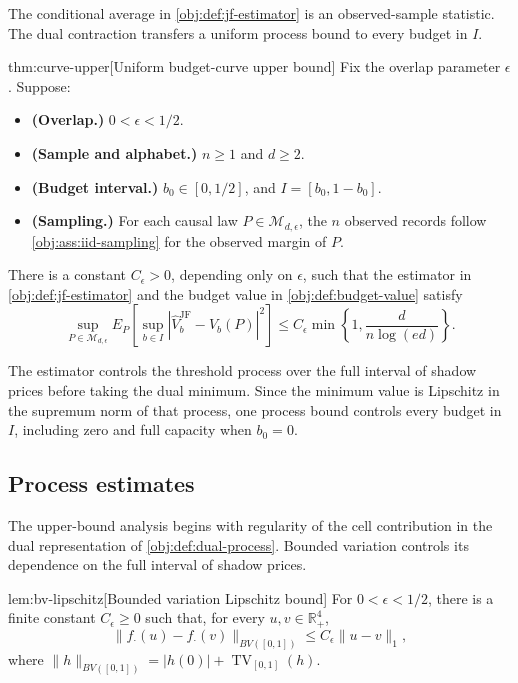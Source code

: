 The conditional average in \cref{obj:def:jf-estimator} is an observed-sample statistic. The dual contraction transfers a uniform process bound to every budget in \(I\).

\begin{theoremv}{thm:curve-upper}[Uniform budget-curve upper bound]
Fix the overlap parameter \(\epsilon\). Suppose:
\begin{itemize}
\item \textbf{(Overlap.)} \(0<\epsilon<1/2\).
\item \textbf{(Sample and alphabet.)} \(n\geq 1\) and \(d\geq 2\).
\item \textbf{(Budget interval.)} \(b_0\in[0,1/2]\), and \(I=[b_0,1-b_0]\).
\item \textbf{(Sampling.)} For each causal law \(P\in\mathcal M_{d,\epsilon}\), the \(n\) observed records follow \cref{obj:ass:iid-sampling} for the observed margin of \(P\).
\end{itemize}
There is a constant \(C_\epsilon>0\), depending only on \(\epsilon\), such that the estimator in \cref{obj:def:jf-estimator} and the budget value in \cref{obj:def:budget-value} satisfy
\[
\sup_{P\in\mathcal M_{d,\epsilon}}
E_P\!\left[
\sup_{b\in I}
\left|\widehat V_b^{\mathrm{JF}}-V_b(P)\right|^2
\right]
\leq
C_\epsilon\min\left\{1,\frac{d}{n\log(ed)}\right\}.
\]
\end{theoremv}

The estimator controls the threshold process over the full interval of shadow prices before taking the dual minimum. Since the minimum value is Lipschitz in the supremum norm of that process, one process bound controls every budget in \(I\), including zero and full capacity when \(b_0=0\).

\subsection{Process estimates}

The upper-bound analysis begins with regularity of the cell contribution in the dual representation of \cref{obj:def:dual-process}. Bounded variation controls its dependence on the full interval of shadow prices.

\begin{lemmav}{lem:bv-lipschitz}[Bounded variation Lipschitz bound]
For \(0<\epsilon<1/2\), there is a finite constant \(C_\epsilon\ge 0\) such that, for every \(u,v\in\mathbb R_+^4\),
\[
\|f_{\cdot}(u)-f_{\cdot}(v)\|_{BV([0,1])}
\le C_\epsilon\|u-v\|_1,
\]
where \(\|h\|_{BV([0,1])}=|h(0)|+\operatorname{TV}_{[0,1]}(h)\).
\end{lemmav}

